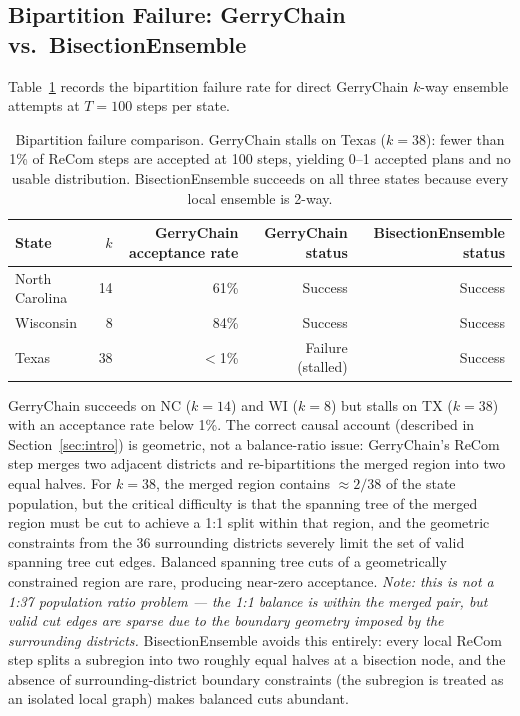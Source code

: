 \subsection{Bipartition Failure: GerryChain vs.\ BisectionEnsemble}
\label{sec:results:failure}

Table~\ref{tab:failure} records the bipartition failure rate for direct
GerryChain $k$-way ensemble attempts at $T=100$ steps per state.

\begin{table}[h]
\centering
\begin{tabular}{lrrrr}
\toprule
State & $k$ & GerryChain acceptance rate & GerryChain status & BisectionEnsemble status \\
\midrule
North Carolina & 14 & 61\% & Success & Success \\
Wisconsin      & 8  & 84\% & Success & Success \\
Texas          & 38 & $<$1\% & Failure (stalled) & Success \\
\bottomrule
\end{tabular}
\caption{Bipartition failure comparison. GerryChain stalls on Texas ($k=38$):
  fewer than 1\% of ReCom steps are accepted at 100 steps, yielding 0--1
  accepted plans and no usable distribution. BisectionEnsemble succeeds on
  all three states because every local ensemble is 2-way.}
\label{tab:failure}
\end{table}

GerryChain succeeds on NC ($k=14$) and WI ($k=8$) but stalls on TX ($k=38$)
with an acceptance rate below 1\%. The correct causal account (described in
Section~\ref{sec:intro}) is geometric, not a balance-ratio issue: GerryChain's
ReCom step merges two adjacent districts and re-bipartitions the merged region
into two equal halves. For $k=38$, the merged region contains $\approx 2/38$
of the state population, but the critical difficulty is that the spanning tree
of the merged region must be cut to achieve a 1:1 split within that region,
and the geometric constraints from the 36 surrounding districts severely limit
the set of valid spanning tree cut edges. Balanced spanning tree cuts of a
geometrically constrained region are rare, producing near-zero acceptance.
\emph{Note: this is not a 1:37 population ratio problem --- the 1:1 balance is
within the merged pair, but valid cut edges are sparse due to the boundary
geometry imposed by the surrounding districts.}
BisectionEnsemble avoids this entirely: every local ReCom
step splits a subregion into two roughly equal halves at a bisection node,
and the absence of surrounding-district boundary constraints (the subregion is
treated as an isolated local graph) makes balanced cuts abundant.

